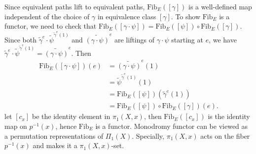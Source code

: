 \documentclass{report}
\begin{document}
\pf
{
	Since equivalent paths lift to equivalent paths, $\mathrm{Fib}_E([\gamma])$ is a well-defined map independent of the choice of $\gamma$ in equivalence class $[\gamma]$. To show $\mathrm{Fib}_E$ is a functor, we need to check that $\mathrm{Fib}_E([\gamma\cdot\psi])=\mathrm{Fib}_E([\psi])\circ\mathrm{Fib}_E([\gamma])$. Since both $\widetilde{\gamma}^e\cdot\widetilde{\psi}^{\widetilde{\gamma}^e(1)}$ and $\widetilde{(\gamma\cdot\psi)}^e$ are liftings of $\gamma\cdot\psi$ starting at $e$, we have $\widetilde{\gamma}^e\cdot\widetilde{\psi}^{\widetilde{\gamma}^e(1)}=\widetilde{(\gamma\cdot\psi)}^e$. Then
	\begin{align*}
		\mathrm{Fib}_E([\gamma\cdot\psi])(e)&=\widetilde{(\gamma\cdot\psi)}^e(1)\\
		&=\widetilde{\psi}^{\widetilde{\gamma}^e(1)}(1)\\
		&=\mathrm{Fib}_E([\psi])(\widetilde{\gamma}^e(1))\\
		&=\mathrm{Fib}_E([\psi])\circ\mathrm{Fib}_E([\gamma])(e).
	\end{align*}
	let $[c_x]$ be the identity element in $\pi_1(X,x)$, then $\mathrm{Fib}_E([c_x])$ is the identity map on $p^{-1}(x)$, hence $\mathrm{Fib}_E$ is a functor.
}
Monodromy functor can be viewed as a permutation representations of $\Pi_1(X)$. Specially, $\pi_1(X, x)$ acts on the fiber $p^{-1}(x)$ and makes it a $\pi_1(X, x)$-set. 

\pf{
}
\end{document}
